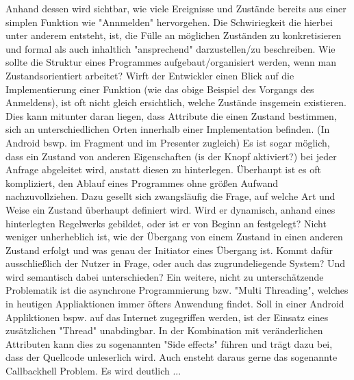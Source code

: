 Anhand dessen wird sichtbar, wie viele Ereignisse und Zustände bereits aus einer simplen Funktion wie "Annmelden" hervorgehen.
Die Schwiriegkeit die hierbei unter anderem entsteht, ist, die Fülle an möglichen Zuständen zu konkretisieren und 
formal als auch inhaltlich "ansprechend" darzustellen/zu beschreiben.
Wie sollte die Struktur eines Programmes aufgebaut/organisiert werden, wenn man Zustandsorientiert arbeitet?
Wirft der Entwickler einen Blick auf die Implementierung  einer Funktion (wie das obige Beispiel des Vorgangs des Anmeldens), 
ist oft nicht gleich ersichtlich, welche Zustände insgemein existieren.
Dies kann mitunter daran liegen, dass Attribute die einen Zustand bestimmen, sich an unterschiedlichen Orten innerhalb
einer Implementation befinden. (In Android bswp. im Fragment und im Presenter zugleich)
Es ist sogar möglich, dass ein Zustand von anderen Eigenschaften (is der Knopf aktiviert?) bei jeder Anfrage abgeleitet wird,
anstatt diesen zu hinterlegen.
Überhaupt ist es oft kompliziert, den Ablauf eines Programmes ohne größen Aufwand nachzuvollziehen.
Dazu gesellt sich zwangsläufig die Frage, auf welche Art und Weise ein Zustand überhaupt definiert wird. 
Wird er dynamisch, anhand eines hinterlegten Regelwerks gebildet, oder ist er von Beginn an festgelegt?
Nicht weniger unherheblich ist, wie der Übergang von einem Zustand in einen anderen Zustand erfolgt und was 
genau der Initiator eines Übergang ist.
Kommt dafür ausschließlich der Nutzer in Frage, oder auch das zugrundeliegende System? Und wird semantisch dabei unterschieden? 
Ein weitere, nicht zu unterschätzende Problematik ist die asynchrone Programmierung bzw. "Multi Threading",
welches in heutigen Appliaktionen immer öfters Anwendung findet. Soll in einer Android Appliktionen bspw. auf das Internet
zugegriffen werden, ist der Einsatz eines zusätzlichen "Thread" un­ab­ding­bar.
In der Kombination mit veränderlichen Attributen kann dies zu sogenannten "Side effects" führen und trägt dazu bei, 
dass der Quellcode unleserlich wird. Auch ensteht daraus gerne das sogenannte Callbackhell Problem.
Es wird deutlich ...



% 



